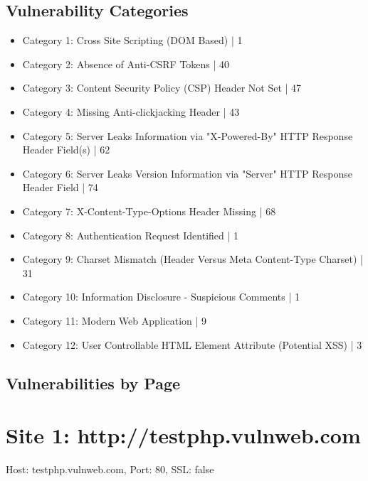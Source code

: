 \documentclass[12pt]{article}
\begin{document}
\subsection{Vulnerability Categories}
\begin{itemize}
\item Category 1: Cross Site Scripting (DOM Based) | 1
\item Category 2: Absence of Anti-CSRF Tokens | 40
\item Category 3: Content Security Policy (CSP) Header Not Set | 47
\item Category 4: Missing Anti-clickjacking Header | 43
\item Category 5: Server Leaks Information via "X-Powered-By" HTTP Response Header Field(s) | 62
\item Category 6: Server Leaks Version Information via "Server" HTTP Response Header Field | 74
\item Category 7: X-Content-Type-Options Header Missing | 68
\item Category 8: Authentication Request Identified | 1
\item Category 9: Charset Mismatch (Header Versus Meta Content-Type Charset) | 31
\item Category 10: Information Disclosure - Suspicious Comments | 1
\item Category 11: Modern Web Application | 9
\item Category 12: User Controllable HTML Element Attribute (Potential XSS) | 3

\end{itemize}

\subsection{Vulnerabilities by Page}
\section*{Site 1: http://testphp.vulnweb.com}
Host: testphp.vulnweb.com, Port: 80, SSL: false
\end{document}
